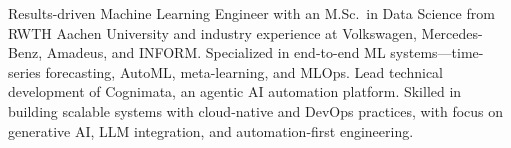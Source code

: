 

\begin{cvparagraph}

Results-driven Machine Learning Engineer with an M.Sc.\ in Data Science from RWTH Aachen University and industry experience at Volkswagen, Mercedes-Benz, Amadeus, and INFORM. Specialized in end-to-end ML systems---time-series forecasting, AutoML, meta-learning, and MLOps. Lead technical development of Cognimata, an agentic AI automation platform. Skilled in building scalable systems with cloud-native and DevOps practices, with focus on generative AI, LLM integration, and automation-first engineering.
\end{cvparagraph}